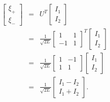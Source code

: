 \documentclass[letterpaper,11pt]{article}
\begin{document}
\begin{eqnarray*}
 \left[ \begin{array}{c} \xi_+ \\ \xi_- \end{array} \right] & = & U^T  \left[ \begin{array}{c} I_1 \\ I_2 \end{array} \right] \\
 & = & \frac{1}{\sqrt{2L}} \left[ \begin{array}{cc} 1 & 1 \\ -1 & 1 \end{array} \right]^T  \left[ \begin{array}{c} I_1 \\ I_2 \end{array} \right] \\
 & = & \frac{1}{\sqrt{2L}} \left[ \begin{array}{cc} 1 & -1 \\ 1 & 1 \end{array} \right]  \left[ \begin{array}{c} I_1 \\ I_2 \end{array} \right] \\
 & = & \frac{1}{\sqrt{2L}} \left[ \begin{array}{c} I_1 - I_2 \\ I_1 + I_2 \end{array} \right].
\end{eqnarray*}
\end{document}
